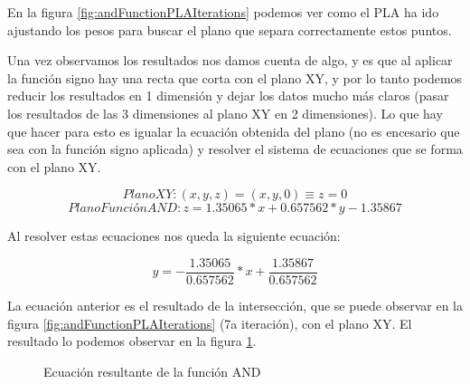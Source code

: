 \newpage

En la figura \ref{fig:andFunctionPLAIterations} podemos ver como el PLA ha ido ajustando los pesos para buscar el plano que separa correctamente estos puntos.

Una vez observamos los resultados nos damos cuenta de algo, y es que al aplicar la función signo hay una recta que corta con el plano XY, y por lo tanto podemos reducir los resultados en 1 dimensión y dejar los datos mucho más claros (pasar los resultados de las 3 dimensiones al plano XY en 2 dimensiones). Lo que hay que hacer para esto es igualar la ecuación obtenida del plano (no es encesario que sea con la función signo aplicada) y resolver el sistema de ecuaciones que se forma con el plano XY.

\[PlanoXY: (x,y,z)=(x,y,0)\equiv z=0\]
\[PlanoFunciónAND:z=1.35065*x+0.657562*y-1.35867\]

Al resolver estas ecuaciones nos queda la siguiente ecuación:

\[y=-\dfrac{1.35065}{0.657562}*x+\dfrac{1.35867}{0.657562}\]

La ecuación anterior es el resultado de la intersección, que se puede observar en la figura \ref{fig:andFunctionPLAIterations} (7a iteración), con el plano XY. El resultado lo podemos observar en la figura \ref{plot:perceptronANDFunction2dim}.

\begin{figure}[!h]
\centering
\caption{Ecuación resultante de la función AND}
\label{plot:perceptronANDFunction2dim}
\end{figure}

